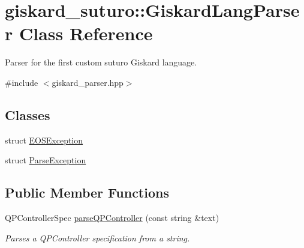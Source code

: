 \hypertarget{classgiskard__suturo_1_1GiskardLangParser}{\section{giskard\-\_\-suturo\-:\-:Giskard\-Lang\-Parser Class Reference}
\label{classgiskard__suturo_1_1GiskardLangParser}
}


Parser for the first custom suturo Giskard language.  




{\ttfamily \#include $<$giskard\-\_\-parser.\-hpp$>$}

\subsection*{Classes}
\begin{DoxyCompactItemize}
\item 
struct \hyperlink{structgiskard__suturo_1_1GiskardLangParser_1_1EOSException}{E\-O\-S\-Exception}
\item 
struct \hyperlink{structgiskard__suturo_1_1GiskardLangParser_1_1ParseException}{Parse\-Exception}
\end{DoxyCompactItemize}
\subsection*{Public Member Functions}
\begin{DoxyCompactItemize}
\item 
Q\-P\-Controller\-Spec \hyperlink{classgiskard__suturo_1_1GiskardLangParser_ac784c6ba7df192ede676f540c6e16988}{parse\-Q\-P\-Controller} (const string \&text)
\begin{DoxyCompactList}\small\item\em Parses a Q\-P\-Controller specification from a string. \end{DoxyCompactList}\end{DoxyCompactItemize}
